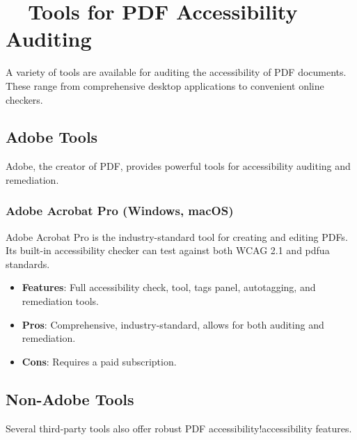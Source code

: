 \section{~~Tools for PDF Accessibility Auditing}
\label{sec:pdf-auditing-tools}
A variety of tools are available for auditing the accessibility of PDF documents. These range from comprehensive desktop  applications to convenient online  checkers.

\subsection{Adobe Tools}
\label{subsec:adobe-tools}
Adobe, the creator of PDF, provides powerful tools for accessibility auditing and remediation.

\subsubsection{Adobe Acrobat Pro (Windows, macOS)}
\label{ssubsec:adobe-acrobat-pro}
Adobe Acrobat Pro is the industry-standard tool for creating and editing PDFs. Its built-in accessibility checker can test against both WCAG 2.1 and \gls{pdfua} standards.
\begin{itemize}
	\item \textbf{Features}: Full accessibility check,  tool, tags panel, autotagging, and remediation tools.
	\item \textbf{Pros}: Comprehensive, industry-standard, allows for both auditing and remediation.
	\item \textbf{Cons}: Requires a paid subscription.
\end{itemize}

\subsection{Non-Adobe Tools}
\label{subsec:non-adobe-tools}
Several third-party tools also offer robust PDF \gls{accessibility}!\gls{accessibility}  features.

